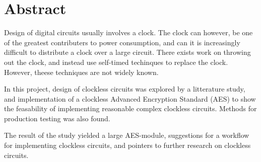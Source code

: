 \section*{Abstract}

Design of digital circuits usually involves a clock. The clock can
however, be one of the greatest contributers to power consumption, and
can it is increasingly difficult to distribute a clock over a large
circuit. There exists work on throwing out the clock, and instead use
self-timed techinques to replace the clock. However, theese techniques
are not widely known.

In this project, design of clockless circuits was explored by a
litterature study, and implementation of a clockless Advanced
Encryption Standard (AES) to show the feasability of implementing
reasonable complex clockless circuits. Methods for production testing
was also found.

The result of the study yielded a large AES-module, suggestions for a
workflow for implementing clockless circuits, and pointers to further
research on clockless circuits.
